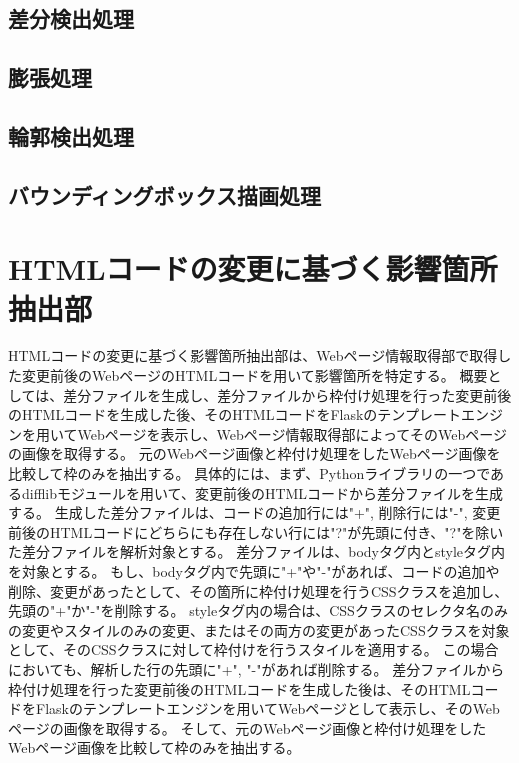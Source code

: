 \subsection{差分検出処理}\label{subsec:difference_detection_process}


\subsection{膨張処理}\label{subsec:dilation}


\subsection{輪郭検出処理}\label{subsec:contour_detection_processing}


\subsection{バウンディングボックス描画処理}\label{subsec:Bounding box drawing process}



\section{HTMLコードの変更に基づく影響箇所抽出部}\label{sec:Affected_area_extraction}
HTMLコードの変更に基づく影響箇所抽出部は、Webページ情報取得部で取得した変更前後のWebページのHTMLコードを用いて影響箇所を特定する。
概要としては、差分ファイルを生成し、差分ファイルから枠付け処理を行った変更前後のHTMLコードを生成した後、そのHTMLコードをFlaskのテンプレートエンジンを用いてWebページを表示し、Webページ情報取得部によってそのWebページの画像を取得する。
元のWebページ画像と枠付け処理をしたWebページ画像を比較して枠のみを抽出する。
具体的には、まず、Pythonライブラリの一つであるdifflibモジュールを用いて、変更前後のHTMLコードから差分ファイルを生成する。
生成した差分ファイルは、コードの追加行には"+", 削除行には"-", 変更前後のHTMLコードにどちらにも存在しない行には"?"が先頭に付き、"?"を除いた差分ファイルを解析対象とする。
差分ファイルは、bodyタグ内とstyleタグ内を対象とする。
もし、bodyタグ内で先頭に"+"や"-"があれば、コードの追加や削除、変更があったとして、その箇所に枠付け処理を行うCSSクラスを追加し、先頭の"+"か"-"を削除する。
styleタグ内の場合は、CSSクラスのセレクタ名のみの変更やスタイルのみの変更、またはその両方の変更があったCSSクラスを対象として、そのCSSクラスに対して枠付けを行うスタイルを適用する。
この場合においても、解析した行の先頭に"+", "-"があれば削除する。
差分ファイルから枠付け処理を行った変更前後のHTMLコードを生成した後は、そのHTMLコードをFlaskのテンプレートエンジンを用いてWebページとして表示し、そのWebページの画像を取得する。
そして、元のWebページ画像と枠付け処理をしたWebページ画像を比較して枠のみを抽出する。

